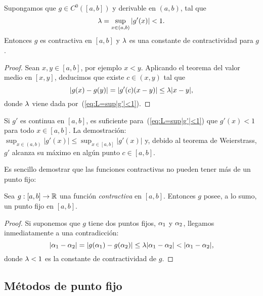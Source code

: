 \begin{proposition}
  \label{pro:1}
  Supongamos que $g\in C^0([a,b])$ y derivable en $(a,b)$, tal que
  \begin{equation}
    \lambda=\sup_{x\in(a,b)} |g'(x)|<1.
    \label{eq:L=sup|g'|<1}
  \end{equation}
  Entonces $g$ es contractiva en $[a,b]$ y $\lambda$ es una
  constante de contractividad para $g$.
\end{proposition}
\begin{proof}
  Sean $x,y\in [a,b]$, por ejemplo $x<y$. Aplicando el teorema del
  valor medio en $[x,y]$, deducimos que existe $c\in (x,y)$ tal que
  \begin{equation*}
    |g(x)-g(y)|=|g'(c)(x-y)| \le \lambda |x-y|,
  \end{equation*}
  donde $\lambda$ viene dada por~(\ref{eq:L=sup|g'|<1}).
\end{proof}

\begin{remark}
  Si $g'$ es continua en $[a,b]$, es suficiente
  para~(\ref{eq:L=sup|g'|<1}) que $g'(x)<1$ para todo $x\in[a,b]$.
  La demostración: $\sup_{x\in(a,b)}|g'(x)| \le \sup_{x\in[a,b]}
  |g'(x)|$ y, debido al teorema de Weierstrass, $g'$ alcanza su máximo
  en algún punto $c\in [a,b]$.
  \label{rk:3}
\end{remark}
Es sencillo demostrar que las funciones contractivas no pueden tener
más de un punto fijo:

\begin{proposition}
  \label{pro:unicidad-punto-fijo}
  Sea $g:[a,b]\to\operatorname{{\mathbb R}}$ una función \emph{contractiva} en
  $[a,b]$. Entonces $g$ posee, a lo sumo, un punto fijo en $[a,b]$.
\end{proposition}

\begin{proof}
  Si suponemos que $g$ tiene dos puntos fijos, $\alpha_1$ y
  $\alpha_2$, llegamos inmediatamente a una contradicción:
  $$
  |\alpha_1-\alpha_2| = |g(\alpha_1)-g(\alpha_2)| \le \lambda |\alpha_1 -
  \alpha_2| < |\alpha_1-\alpha_2|,$$
  donde $\lambda<1$ es la constante de contractividad de $g$.
\end{proof}

\subsection*{Métodos de punto fijo}

